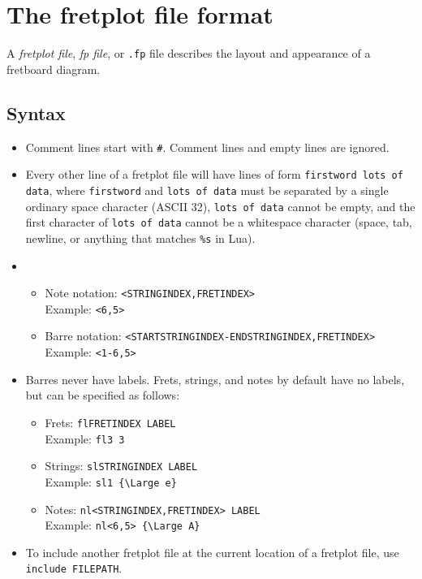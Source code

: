 \documentclass[12pt,letterpaper]{article}
\begin{document}
\newpage

\section{The fretplot file format}

A \textit{fretplot file}, \textit{fp file}, or \texttt{.fp} file describes the layout and appearance of a fretboard diagram.

\subsection{Syntax}

\begin{itemize}
\item Comment lines start with \texttt{\#}. Comment lines and empty lines are ignored.
\item Every other line of a fretplot file will have lines of form \texttt{firstword lots of data}, where \texttt{firstword} and \texttt{lots of data} must be separated by a single ordinary space character (ASCII 32), \texttt{lots of data} cannot be empty, and the first character of \texttt{lots of data} cannot be a whitespace character (space, tab, newline, or anything that matches \texttt{\%s} in Lua).
\item
  \begin{itemize}
  \item Note notation: \texttt{<STRINGINDEX,FRETINDEX>}\\Example: \texttt{<6,5>}

  \item Barre notation: \texttt{<STARTSTRINGINDEX-ENDSTRINGINDEX,FRETINDEX>}\\Example: \texttt{<1-6,5>}
  \end{itemize}
\item Barres never have labels. Frets, strings, and notes by default have no labels, but can be specified as follows:
  \begin{itemize}
    \item Frets: \texttt{flFRETINDEX LABEL}\\Example: \texttt{fl3 3}
    \item Strings: \texttt{slSTRINGINDEX LABEL}\\Example: \texttt{sl1 \{\textbackslash Large e\}}
    \item Notes: \texttt{nl<STRINGINDEX,FRETINDEX> LABEL}\\Example: \texttt{nl<6,5> \{\textbackslash Large A\}}
  \end{itemize}
\item To include another fretplot file at the current location of a fretplot file, use \texttt{include FILEPATH}.
\end{itemize}
\end{document}
